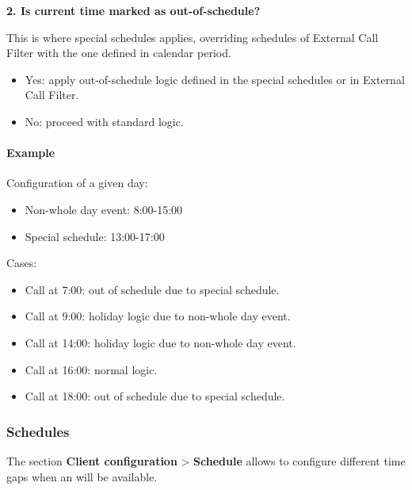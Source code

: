 \documentclass[letterpaper,10pt,english]{sphinxmanual}
\begin{document}
\textbf{2. Is current time marked as out-of-schedule?}

This is where special schedules applies, overriding schedules of External Call Filter with the one defined in calendar
period.
\begin{itemize}
\item {} 
Yes: apply out-of-schedule logic defined in the special schedules or in External Call Filter.

\item {} 
No: proceed with standard logic.

\end{itemize}
\paragraph{Example}

Configuration of a given day:
\begin{itemize}
\item {} 
Non-whole day event: 8:00-15:00

\item {} 
Special schedule: 13:00-17:00

\end{itemize}

Cases:
\begin{itemize}
\item {} 
Call at 7:00: out of schedule due to special schedule.

\item {} 
Call at 9:00: holiday logic due to non-whole day event.

\item {} 
Call at 14:00: holiday logic due to non-whole day event.

\item {} 
Call at 16:00: normal logic.

\item {} 
Call at 18:00: out of schedule due to special schedule.

\end{itemize}


\subsubsection{Schedules}
\label{administration_portal/client/vpbx/routing_tools/schedules:id1}\label{administration_portal/client/vpbx/routing_tools/schedules::doc}\label{administration_portal/client/vpbx/routing_tools/schedules:schedules}
The section \textbf{Client configuration} \textgreater{} \textbf{Schedule} allows to configure
different time gaps when an {\hyperref[administration_portal/brand/views/ddis:ddis]{}} will be available.
\end{document}
